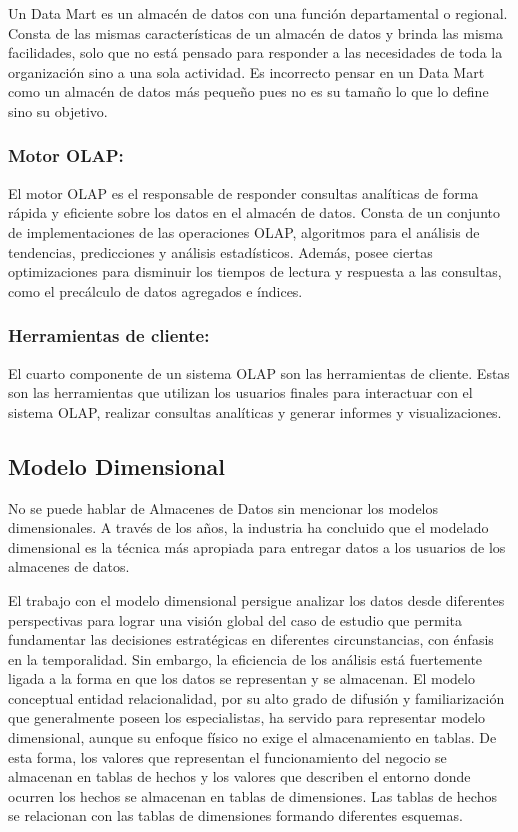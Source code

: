Un Data Mart es un almac\'en de datos con una funci\'on departamental o regional. Consta de las mismas caracter\'isticas de un 
almacén de datos y brinda las misma facilidades, solo que no est\'a pensado para responder a las necesidades de toda la organización
sino a una sola actividad. Es incorrecto pensar en un Data Mart como un almac\'en de datos m\'as pequeño pues no es su tamaño 
lo que lo define sino su objetivo\cite{mijailmaster}.


\subsubsection{Motor OLAP:}
El motor OLAP es el responsable de responder consultas analíticas de forma rápida y eficiente sobre 
los datos en el almacén de datos. Consta de un conjunto de implementaciones de las operaciones OLAP, algoritmos 
para el análisis de tendencias, predicciones y análisis estadísticos. Además, posee ciertas optimizaciones para 
disminuir los tiempos de lectura y respuesta a las consultas, como el precálculo de datos agregados e índices.
 
\subsubsection{Herramientas de cliente:}
El cuarto componente de un sistema OLAP son las herramientas de cliente. Estas son las herramientas que utilizan los 
usuarios finales para interactuar con el sistema OLAP, realizar consultas analíticas y generar informes y visualizaciones.


\subsection{Modelo Dimensional}

No se puede hablar de Almacenes de Datos sin mencionar los modelos dimensionales. A través de los a\~{n}os, la industria 
ha concluido que el modelado dimensional es la técnica m\'as apropiada para entregar datos a los usuarios de los 
almacenes de datos.

El trabajo con el modelo dimensional persigue analizar los datos desde diferentes perspectivas para lograr una visión 
global del caso de estudio que permita fundamentar las decisiones estratégicas en diferentes circunstancias, con énfasis 
en la temporalidad. Sin embargo, la eficiencia de los análisis est\'a fuertemente ligada a la forma en que los datos 
se representan y se almacenan. El modelo conceptual entidad relacionalidad, por su alto grado de difusión y familiarización que generalmente 
poseen los especialistas, ha servido para representar modelo dimensional, aunque su enfoque f\'isico 
no exige el almacenamiento en tablas. De esta forma, los valores que representan el funcionamiento del negocio se almacenan 
en tablas de hechos y los valores que describen el entorno donde ocurren los hechos se almacenan en tablas de dimensiones.
Las tablas de hechos se relacionan con las tablas de dimensiones formando diferentes esquemas.

